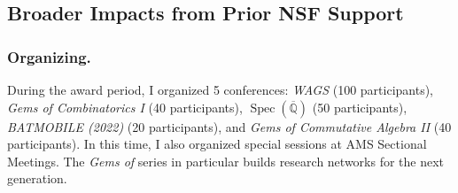 \documentclass[11pt,reqno]{amsart}
\theoremstyle{remark}
\newcommand{\Spec}{\operatorname{Spec}}
\newcommand{\QQ}{\mathbb{Q}}
\begin{document}
\subsection{Broader Impacts from Prior NSF Support}

\subsubsection{Organizing.}\label{subsubsec:prior-organizing} During the award period, I organized 5 conferences: \textit{WAGS} (100 participants), \textit{Gems of Combinatorics I} (40 participants), $\Spec(\overline{\QQ})$ (50 participants), \textit{BATMOBILE (2022)} (20 participants), and \textit{Gems of Commutative Algebra II} (40 participants). In this time, I also organized special sessions at AMS Sectional Meetings. The \textit{Gems of} series in particular builds research networks for the next generation.


\end{document}
